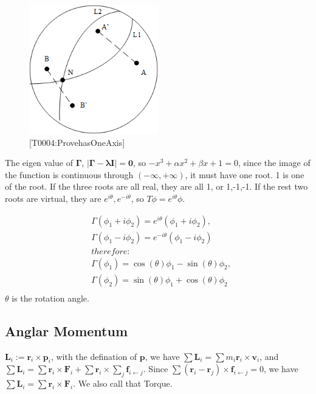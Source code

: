 \documentclass[UTF8]{../06-Physics}
\begin{document}
\begin{figure}[h]
    \centering
    \includegraphics[width=0.5\textwidth]{../src/T0004_20211212_ProvehasOneAxis.png}
    \caption{[T0004:ProvehasOneAxis]}
\end{figure}

The eigen value of $\boldsymbol{\Gamma }$, $\left\lvert \boldsymbol{\Gamma }-\boldsymbol{\lambda I}\right\rvert = \boldsymbol{0}$, so $-x^3 +\alpha x^2 +\beta x +1 = 0$, since the image of the function is continuous through $(-\infty , + \infty )$, it must have one root. 1 is one of the root. If the three roots are all real, they are all 1, or 1,-1,-1. If the rest two roots are virtual, they are $e^{i\theta},e^{-i\theta}$, so $T \phi = e^{i\theta} \phi $. 



\begin{equation}
    \begin{split}
    &\Gamma (\phi_1 + i \phi_2)   = e^{i\theta}(\phi_1 + i \phi_2) ,\\
    & \Gamma (\phi_1 - i \phi_2)   = e^{-i\theta}(\phi_1 - i \phi_2) \\
    &therefore:\\
    & \Gamma (\phi_1 ) = \cos(\theta) \phi_1  - \sin(\theta) \phi_2, \\
    &  \Gamma (\phi_2) = \sin(\theta) \phi_1  +\cos(\theta) \phi_2\\
\end{split}
\end{equation}
$\theta$ is the rotation angle.







\subsection{Anglar Momentum}
$\boldsymbol{L}_i := \boldsymbol{r}_i \times \boldsymbol{p}_i  $, with the defination of $\boldsymbol{p}$, we have $\sum \boldsymbol{L}_i  =\sum m_i \boldsymbol{r}_i \times \boldsymbol{v}_i$, and $\sum \boldsymbol{L}_i  =\sum \boldsymbol{r}_i \times \boldsymbol{F}_i + \sum \boldsymbol{r}_i \times \sum_j \boldsymbol{f}_{i \leftarrow j}$. Since $\sum(\boldsymbol{r}_i -\boldsymbol{r}_j) \times \boldsymbol{f}_{i \leftarrow j}  = 0$, we have $\sum \boldsymbol{L}_i  =\sum \boldsymbol{r}_i \times \boldsymbol{F}_i $. We also call that Torque.
\end{document}
